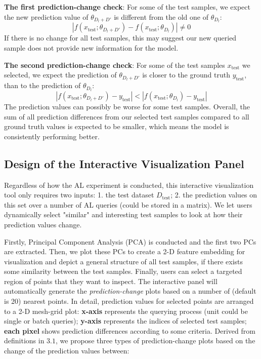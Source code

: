 \documentclass{article}
\begin{document}
\textbf{The first prediction-change check}:
For some of the test samples, we expect the new prediction value of $\theta_{D_{l} + D'}$ is different from the old one of $\theta_{D_{l}}$:
\begin{equation}
| f( x_{\text{test}} ;\theta_{D_{l} + D'}) - f( x_{\text{test}} ;\theta_{D_{l}})| \neq 0
\label{eq:check1}
\end{equation}
If there is no change for all test samples, this may suggest our new queried sample does not provide new information for the model.

\textbf{The second prediction-change check}:
For some of the test samples $x_{\text{test}}$ we selected, we expect the prediction of $\theta_{D_{l} + D'}$ is closer to the ground truth $y_{\text{test}}$, than to the prediction of $\theta_{D_{l}}$:
\begin{equation}
| f( x_{\text{test}} ;\theta_{D_{l} + D'}) - y_{\text{test}}| < | f( x_{\text{test}} ;\theta_{D_{l}}) - y_{\text{test}} |
\label{eq:check2}
\end{equation}
The prediction values can possibly be worse for some test samples. Overall, the sum of all prediction differences from our selected test samples compared to all ground truth values is expected to be smaller, which means the model is consistently performing better. 


\subsection{Design of the Interactive Visualization Panel}

Regardless of how the AL experiment is conducted, this interactive visualization tool only requires two inputs: 1. the test dataset $D_{\text{test}}$; 2. the prediction values on this set over a number of AL queries (could be stored in a matrix). We let users dynamically select "similar" and interesting test samples to look at how their prediction values change.

Firstly, Principal Component Analysis (PCA) is conducted and the first two PCs are extracted. Then, we plot these PCs to create a 2-D feature embedding for visualization and depict a general structure of all test samples, if there exists some similarity between the test samples. Finally, users can select a targeted region of points that they want to inspect. The interactive panel will automatically generate the \textit{prediction-change} plots based on a number of (default is 20) nearest points. In detail, prediction values for selected points are arranged to a 2-D mesh-grid plot: \textbf{x-axis} represents the querying process (unit could be single or batch queries); \textbf{y-axis} represents the indices of selected test samples; \textbf{each pixel} shows prediction differences according to some criteria. Derived from definitions in $3.1$, we propose three types of prediction-change plots based on the change of the prediction values between:
\end{document}
